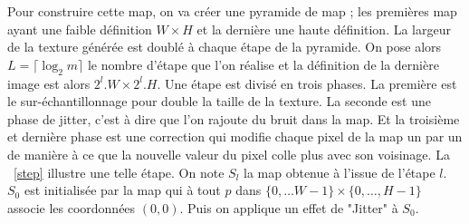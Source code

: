 \documentclass[12pt]{article}
\begin{document}
Pour construire cette map, on va créer une pyramide de map ; les premières map ayant une faible définition $W \times H$ et la dernière une haute définition. La largeur de la texture générée est doublé à chaque étape de la pyramide. On pose alors $L = \lceil \log_2 m \rceil$ le nombre d'étape que l'on réalise et la définition de la dernière image est alors $2^l . W \times 2^l . H$. Une étape est divisé en trois phases. La première est le sur-échantillonnage pour double la taille de la texture. La seconde est une phase de jitter, c'est à dire que l'on rajoute du bruit dans la map. Et la troisième et dernière phase est une correction qui modifie chaque pixel de la map un par un de manière à ce que la nouvelle valeur du pixel colle plus avec son voisinage. La \figurename~\ref{step} illustre une telle étape. On note $S_l$ la map obtenue à l'issue de l'étape $l$. $S_0$ est initialisée par la map qui à tout $p$ dans $\{ 0, \dots W-1 \} \times \{ 0, \dots, H-1 \}$ associe les coordonnées $(0, 0)$. Puis on applique un effet de "Jitter" à $S_0$.
\end{document}

